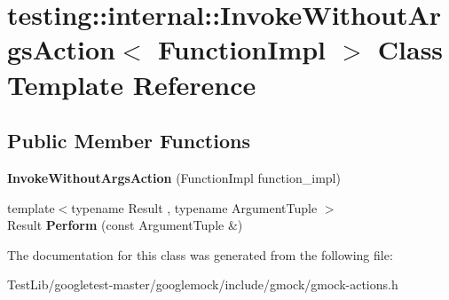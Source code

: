 \hypertarget{classtesting_1_1internal_1_1InvokeWithoutArgsAction}{}\section{testing\+:\+:internal\+:\+:Invoke\+Without\+Args\+Action$<$ Function\+Impl $>$ Class Template Reference}
\label{classtesting_1_1internal_1_1InvokeWithoutArgsAction}
\subsection*{Public Member Functions}
\begin{DoxyCompactItemize}
\item 
\mbox{\label{classtesting_1_1internal_1_1InvokeWithoutArgsAction_a05d4006d8ab70e78172bf678b1d15f18}} 
{\bfseries Invoke\+Without\+Args\+Action} (Function\+Impl function\+\_\+impl)
\item 
\mbox{\label{classtesting_1_1internal_1_1InvokeWithoutArgsAction_abdad2b7d19ff1cbd1d07a4bd585e3f4c}} 
{\footnotesize template$<$typename Result , typename Argument\+Tuple $>$ }\\Result {\bfseries Perform} (const Argument\+Tuple \&)
\end{DoxyCompactItemize}


The documentation for this class was generated from the following file\+:\begin{DoxyCompactItemize}
\item 
Test\+Lib/googletest-\/master/googlemock/include/gmock/gmock-\/actions.\+h\end{DoxyCompactItemize}
